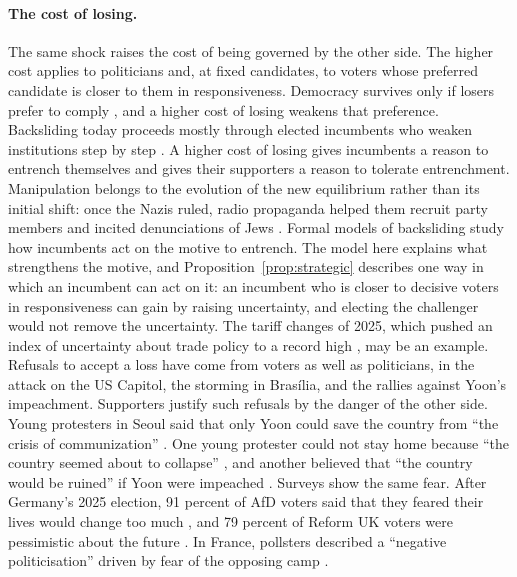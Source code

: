 \documentclass[12pt,letterpaper]{article}
\begin{document}
\paragraph{The cost of losing.}
The same shock raises the cost of being governed by the other side. The higher cost applies to politicians and, at fixed candidates, to voters whose preferred candidate is closer to them in responsiveness. Democracy survives only if losers prefer to comply \citep{Przeworski1991}, and a higher cost of losing weakens that preference. Backsliding today proceeds mostly through elected incumbents who weaken institutions step by step \citep{Bermeo2016,HaggardKaufman2021,Przeworski2019}. A higher cost of losing gives incumbents a reason to entrench themselves and gives their supporters a reason to tolerate entrenchment. Manipulation belongs to the evolution of the new equilibrium rather than its initial shift: once the Nazis ruled, radio propaganda helped them recruit party members and incited denunciations of Jews \citep{Adena2015}. Formal models of backsliding study how incumbents act on the motive to entrench. The model here explains what strengthens the motive, and Proposition~\ref{prop:strategic} describes one way in which an incumbent can act on it: an incumbent who is closer to decisive voters in responsiveness can gain by raising uncertainty, and electing the challenger would not remove the uncertainty. The tariff changes of 2025, which pushed an index of uncertainty about trade policy to a record high \citep{Caldara2020}, may be an example. Refusals to accept a loss have come from voters as well as politicians, in the attack on the US Capitol, the storming in Bras\'{i}lia, and the rallies against Yoon's impeachment. Supporters justify such refusals by the danger of the other side. Young protesters in Seoul said that only Yoon could save the country from ``the crisis of communization'' \citep{SBS2025}. One young protester could not stay home because ``the country seemed about to collapse'' \citep{FinanceToday2024}, and another believed that ``the country would be ruined'' if Yoon were impeached \citep{MBC2025}. Surveys show the same fear. After Germany's 2025 election, 91 percent of AfD voters said that they feared their lives would change too much \citep{AA2025}, and 79 percent of Reform UK voters were pessimistic about the future \citep{Byrne2025}. In France, pollsters described a ``negative politicisation'' driven by fear of the opposing camp \citep{AFP2024}.
\end{document}
